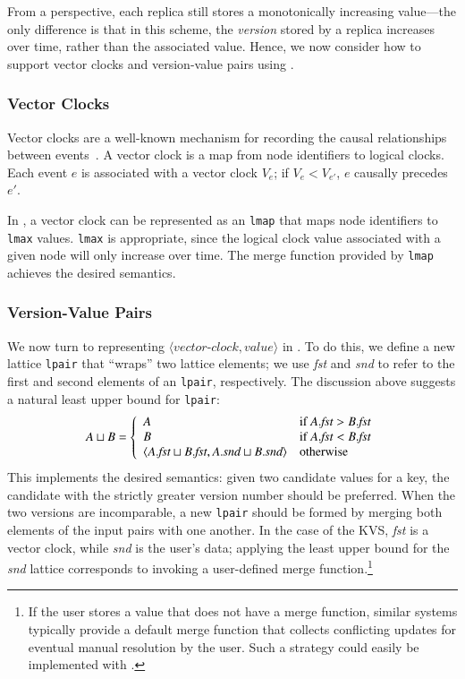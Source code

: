 From a \lang perspective, each replica still stores a monotonically increasing
value---the only difference is that in this scheme, the \emph{version} stored by
a replica increases over time, rather than the associated value. Hence, we now
consider how to support vector clocks and version-value pairs using \lang.

\subsubsection{Vector Clocks}
Vector clocks are a well-known mechanism for recording the causal relationships
between events~\cite{Fidge1988}. A vector clock is a map from node identifiers
to logical clocks. Each event $e$ is associated with a vector clock $V_e$; if
$V_e < V_{e'}$, $e$ causally precedes $e'$.

In \lang, a vector clock can be represented as an \texttt{lmap} that maps node
identifiers to \texttt{lmax} values. \texttt{lmax} is appropriate, since the
logical clock value associated with a given node will only increase over
time. The merge function provided by \texttt{lmap} achieves the desired
semantics.

\subsubsection{Version-Value Pairs}
We now turn to representing $\langle\textit{vector-clock},\textit{value}\rangle$
in \lang. To do this, we define a new lattice \texttt{lpair} that ``wraps'' two
lattice elements; we use \emph{fst} and \emph{snd} to refer to the first and
second elements of an \texttt{lpair}, respectively. The discussion above
suggests a natural least upper bound for \texttt{lpair}:
\begin{displaymath}
  A \sqcup B = \left\{
    \begin{array}{l l}
      A & \textrm{if } A.\textit{fst} > B.\textit{fst} \\
      B & \textrm{if } A.\textit{fst} < B.\textit{fst} \\
      \langle A.\textit{fst} \sqcup B.\textit{fst}, A.\textit{snd} \sqcup B.\textit{snd}\rangle & \textrm{otherwise} \\
    \end{array} \right. 
\end{displaymath}
This implements the desired semantics: given two candidate values for a key, the
candidate with the strictly greater version number should be preferred. When the
two versions are incomparable, a new \texttt{lpair} should be formed by merging
both elements of the input pairs with one another. In the case of the KVS,
\emph{fst} is a vector clock, while \emph{snd} is the user's data; applying the
least upper bound for the \emph{snd} lattice corresponds to invoking a
user-defined merge function.\footnote{If the user stores a value that does not
  have a merge function, similar systems typically provide a default merge
  function that collects conflicting updates for eventual manual resolution by
  the user. Such a strategy could easily be implemented with \lang.}

